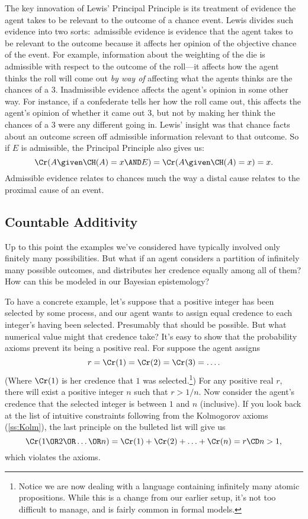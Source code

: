 The key innovation of Lewis' Principal Principle is its treatment of evidence the agent takes to be relevant to the outcome of a chance event. Lewis divides such evidence into two sorts:\ admissible evidence is evidence that the agent takes to be relevant to the outcome because it affects her opinion of the objective chance of the event. For example, information about the weighting of the die is admissible with respect to the outcome of the roll---it affects how the agent thinks the roll will come out \emph{by way of} affecting what the agents thinks are the chances of a $3$. Inadmissible evidence affects the agent's opinion in some other way. For instance, if a confederate tells her how the roll came out, this affects the agent's opinion of whether it came out $3$, but not by making her think the chances of a $3$ were any different going in. Lewis' insight was that chance facts about an outcome screen off admissible information relevant to that outcome. So if $E$ is admissible, the Principal Principle also gives us: 
\begin{equation}
\Cr(A \given \CH(A)=x \AND E) = \Cr(A \given \CH(A)=x)=x.
\end{equation}
Admissible evidence relates to chances much the way a distal cause relates to the proximal cause of an event.

\subsection{Countable Additivity} \label{ss:infinite}
Up to this point the examples we've considered have typically involved only finitely many possibilities. But what if an agent considers a partition of infinitely many possible outcomes, and distributes her credence equally among all of them? How can this be modeled in our Bayesian epistemology?

To have a concrete example, let's suppose that a positive integer has been selected by some process, and our agent wants to assign equal credence to each integer's having been selected. Presumably that should be possible. But what numerical value might that credence take? It's easy to show that the probability axioms prevent its being a positive real. For suppose the agent assigns
\begin{equation}
r=\Cr(1)=\Cr(2)=\Cr(3)=\ldots.
\end{equation}
(Where $\Cr(1)$ is her credence that $1$ was selected.\footnote
{Notice we are now dealing with a language containing infinitely many atomic propositions. While this is a change from our earlier setup, it's not too difficult to manage, and is fairly common in formal models.}) For any positive real $r$, there will exist a positive integer $n$ such that $r>1/n$. Now consider the agent's credence that the selected integer is between $1$ and $n$ (inclusive). If you look back at the list of intuitive constraints following from the Kolmogorov axioms (\autoref{ss:Kolm}), the last principle on the bulleted list will give us
\begin{equation} \label{eq:addem}
\Cr(1 \OR 2 \OR \ldots \OR n)=\Cr(1) + \Cr(2) + \ldots + \Cr(n) = r \CD n > 1,
\end{equation}
which violates the axioms.

